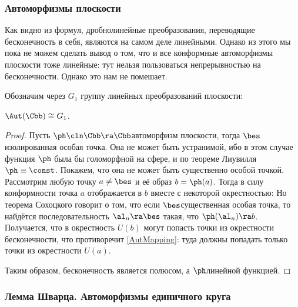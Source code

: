 \documentclass[a4paper]{article}
\begin{document}
\subsubsection{Автоморфизмы плоскости}

Как видно из формул, дробно\д линейные преобразования, переводящие бесконечность в себя, являются
на самом деле линейными. Однако из этого мы пока не можем сделать вывод о том, что и все конформные автоморфизмы
плоскости тоже линейные: тут нельзя пользоваться непрерывностью на бесконечности. Однако это нам не помешает.

Обозначим через $G_1$ группу линейных преобразований плоскости:

\begin{theorem}
$\Aut(\Cbb)\cong G_1$.
\end{theorem}
\begin{proof}
Пусть $\ph\cln\Cbb\ra\Cbb$\т автоморфизм плоскости, тогда $\bes$\т изолированная особая точка. Она не может
быть устранимой, ибо в этом случае функция $\ph$ была бы голоморфной на  сфере, и по теореме Лиувилля $\ph\equiv\const$.
Покажем, что она не может быть существенно особой точкой. Рассмотрим любую точку $a \neq \bes$ и её образ $b=\ph(a)$.
Тогда в силу конформности точка $a$ отображается в $b$ вместе с некоторой окрестностью:
Но теорема Сохоцкого говорит о том, что если $\bes$\т существенная особая точка, то найдётся последовательность $\al_n \ra \bes$
такая, что $\ph(\al_n) \ra b$. Получается, что в окрестность $U(b)$ могут попасть точки из окрестности бесконечности, что
противоречит \eqref{AutMapping}: туда должны попадать только точки из окрестности $U(a)$.

Таким образом, бесконечность является полюсом, а $\ph$\т линейной функцией.
\end{proof}

\subsubsection{Лемма Шварца. Автоморфизмы единичного круга}
\end{document}
